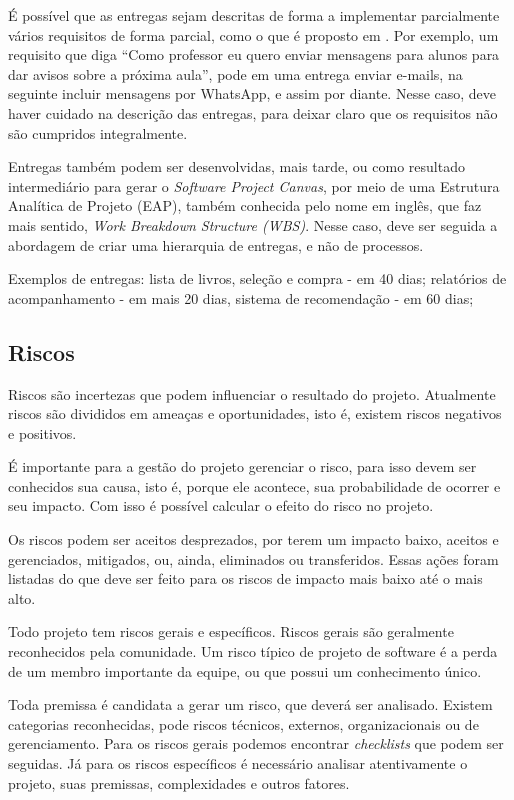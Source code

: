 \documentclass[a4]{report}
\begin{document}
É possível que as entregas sejam descritas de forma a implementar parcialmente vários requisitos de forma parcial, como o que é proposto em \citep{jacobson:2011:uc2p0}. Por exemplo, um requisito que diga ``Como professor eu quero enviar mensagens para alunos para dar avisos sobre a próxima aula'', pode em uma entrega enviar e-mails, na seguinte incluir mensagens por WhatsApp, e assim por diante. Nesse caso, deve haver cuidado na descrição das entregas, para deixar claro que os requisitos não são cumpridos integralmente.

Entregas também podem ser desenvolvidas, mais tarde, ou como resultado intermediário para gerar o \textit{Software Project Canvas}, por meio de uma Estrutura Analítica de Projeto (EAP), também conhecida pelo nome em inglês, que faz mais sentido, \textit{Work Breakdown Structure (WBS)}. Nesse caso, deve ser seguida a abordagem de criar uma hierarquia de entregas, e não de processos.

Exemplos de entregas: lista de livros, seleção e compra - em 40 dias; relatórios de acompanhamento - em mais 20 dias, sistema de recomendação - em 60 dias;

\subsection{Riscos}

Riscos são incertezas que podem influenciar o resultado do projeto. Atualmente riscos são divididos em ameaças e oportunidades, isto é, existem riscos negativos e positivos.


É importante para a gestão do projeto gerenciar o risco, para isso devem ser conhecidos sua causa, isto é, porque ele acontece, sua probabilidade de ocorrer e seu impacto. Com isso é possível calcular o efeito do risco no projeto.

Os riscos podem ser aceitos desprezados, por terem um impacto baixo, aceitos e gerenciados, mitigados, ou, ainda, eliminados ou transferidos. Essas ações foram listadas do que deve ser feito para os riscos de impacto mais baixo até o mais alto.

Todo projeto tem riscos gerais e específicos. Riscos gerais são geralmente reconhecidos pela comunidade. Um risco típico de projeto de software é a perda de um membro importante da equipe, ou que possui um conhecimento único.


Toda premissa é candidata a gerar um risco, que deverá ser analisado. Existem categorias reconhecidas, pode riscos técnicos, externos, organizacionais ou de gerenciamento\citep{pmbok:6}.
Para os riscos gerais podemos encontrar \textit{checklists} que podem ser seguidas. Já para os riscos específicos é necessário analisar atentivamente o projeto, suas premissas, complexidades e outros fatores.
\end{document}
